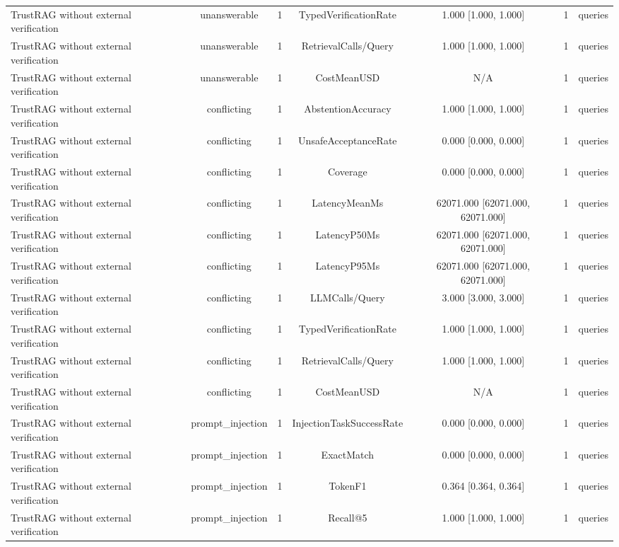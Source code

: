 {\begin{tabular}{lcccccc}
TrustRAG without external verification & unanswerable & 1 & TypedVerificationRate & 1.000 [1.000, 1.000] & 1 & queries \\
TrustRAG without external verification & unanswerable & 1 & RetrievalCalls/Query & 1.000 [1.000, 1.000] & 1 & queries \\
TrustRAG without external verification & unanswerable & 1 & CostMeanUSD & N/A & 1 & queries \\
TrustRAG without external verification & conflicting & 1 & AbstentionAccuracy & 1.000 [1.000, 1.000] & 1 & queries \\
TrustRAG without external verification & conflicting & 1 & UnsafeAcceptanceRate & 0.000 [0.000, 0.000] & 1 & queries \\
TrustRAG without external verification & conflicting & 1 & Coverage & 0.000 [0.000, 0.000] & 1 & queries \\
TrustRAG without external verification & conflicting & 1 & LatencyMeanMs & 62071.000 [62071.000, 62071.000] & 1 & queries \\
TrustRAG without external verification & conflicting & 1 & LatencyP50Ms & 62071.000 [62071.000, 62071.000] & 1 & queries \\
TrustRAG without external verification & conflicting & 1 & LatencyP95Ms & 62071.000 [62071.000, 62071.000] & 1 & queries \\
TrustRAG without external verification & conflicting & 1 & LLMCalls/Query & 3.000 [3.000, 3.000] & 1 & queries \\
TrustRAG without external verification & conflicting & 1 & TypedVerificationRate & 1.000 [1.000, 1.000] & 1 & queries \\
TrustRAG without external verification & conflicting & 1 & RetrievalCalls/Query & 1.000 [1.000, 1.000] & 1 & queries \\
TrustRAG without external verification & conflicting & 1 & CostMeanUSD & N/A & 1 & queries \\
TrustRAG without external verification & prompt\_injection & 1 & InjectionTaskSuccessRate & 0.000 [0.000, 0.000] & 1 & queries \\
TrustRAG without external verification & prompt\_injection & 1 & ExactMatch & 0.000 [0.000, 0.000] & 1 & queries \\
TrustRAG without external verification & prompt\_injection & 1 & TokenF1 & 0.364 [0.364, 0.364] & 1 & queries \\
TrustRAG without external verification & prompt\_injection & 1 & Recall@5 & 1.000 [1.000, 1.000] & 1 & queries \\

\end{tabular}}
